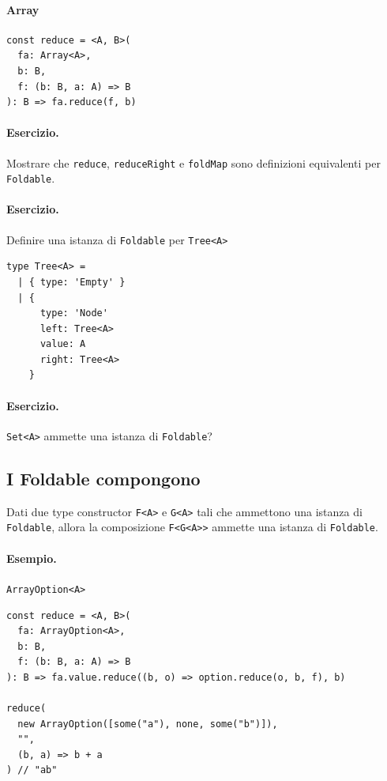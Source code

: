 \documentclass[12pt]{article}
\begin{document}
\paragraph{Array}

\begin{verbatim}
const reduce = <A, B>(
  fa: Array<A>,
  b: B,
  f: (b: B, a: A) => B
): B => fa.reduce(f, b)
\end{verbatim}

\paragraph{Esercizio.} Mostrare che \texttt{reduce}, \texttt{reduceRight} e \texttt{foldMap} sono definizioni equivalenti per \texttt{Foldable}.

\paragraph{Esercizio.} Definire una istanza di \texttt{Foldable} per \texttt{Tree<A>}

\begin{verbatim}
type Tree<A> =
  | { type: 'Empty' }
  | {
      type: 'Node'
      left: Tree<A>
      value: A
      right: Tree<A>
    }
\end{verbatim}

\paragraph{Esercizio.} \texttt{Set<A>} ammette una istanza di \texttt{Foldable}?

\subsection{I Foldable compongono}

Dati due type constructor \texttt{F<A>} e \texttt{G<A>} tali che ammettono una istanza di \texttt{Foldable}, allora la composizione \texttt{F<G<A>>}
ammette una istanza di \texttt{Foldable}.

\paragraph{Esempio.} \texttt{ArrayOption<A>}

\begin{verbatim}
const reduce = <A, B>(
  fa: ArrayOption<A>,
  b: B,
  f: (b: B, a: A) => B
): B => fa.value.reduce((b, o) => option.reduce(o, b, f), b)

reduce(
  new ArrayOption([some("a"), none, some("b")]),
  "",
  (b, a) => b + a
) // "ab"
\end{verbatim}
\end{document}
